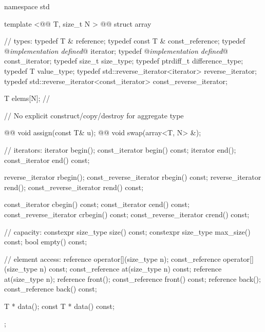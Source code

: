 \documentclass[american,twoside]{book}
\begin{document}
%
%
%
%
%
%
%
%
%
\begin{codeblock}
namespace std {
  template <@@ T, size_t N >
  @@
  struct array {
    //  types:
    typedef T &                                   reference;
    typedef const T &                             const_reference;
    typedef @{\itshape implementation defined}@                iterator;
    typedef @{\itshape implementation defined}@                const_iterator;
    typedef size_t                                size_type;
    typedef ptrdiff_t                             difference_type;
    typedef T                                     value_type;
    typedef std::reverse_iterator<iterator>       reverse_iterator;
    typedef std::reverse_iterator<const_iterator> const_reverse_iterator;

    T       elems[N];           // \expos

    // No explicit construct/copy/destroy for aggregate type

    @@ void assign(const T& u);
    @@ void swap(array<T, N> &);

    // iterators:
    iterator               begin();
    const_iterator         begin() const;
    iterator               end();
    const_iterator         end() const;

    reverse_iterator       rbegin();
    const_reverse_iterator rbegin() const;
    reverse_iterator       rend();
    const_reverse_iterator rend() const;

    const_iterator         cbegin() const;
    const_iterator         cend() const;
    const_reverse_iterator crbegin() const;
    const_reverse_iterator crend() const;

    // capacity:
    constexpr size_type size() const;
    constexpr size_type max_size() const;
    bool      empty() const;

    // element access:
    reference       operator[](size_type n);
    const_reference operator[](size_type n) const;
    const_reference at(size_type n) const;
    reference       at(size_type n);
    reference       front();
    const_reference front() const;
    reference       back();
    const_reference back() const;

    T *       data();
    const T * data() const;
  };
}
\end{codeblock}
\end{document}
